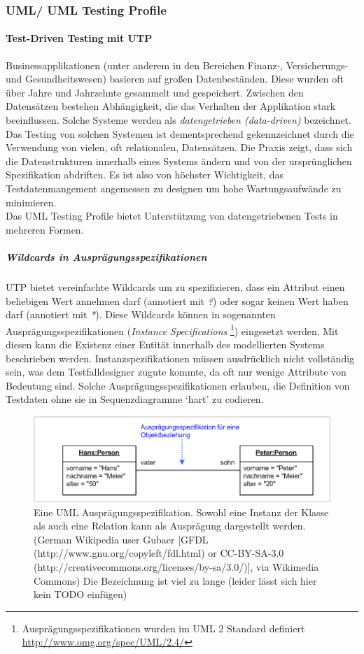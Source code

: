 \subsubsection{UML/ UML Testing Profile}
\paragraph{Test-Driven Testing mit UTP}
Businessapplikationen (unter anderem in den Bereichen Finanz-, Versicherungs- und Gesundheitswesen) basieren auf großen Datenbeständen. Diese wurden oft über Jahre und Jahrzehnte gesammelt und gespeichert. Zwischen den Datensätzen bestehen Abhängigkeit, die das Verhalten der Applikation stark beeinflussen. Solche Systeme werden als \textit{datengetrieben (data-driven)} bezeichnet. Das Testing von solchen Systemen ist dementsprechend gekennzeichnet durch die Verwendung von vielen, oft relationalen, Datensätzen. Die Praxis zeigt, dass sich die Datenstrukturen innerhalb eines Systems ändern und von der ursprünglichen Spezifikation abdriften. Es ist also von höchster Wichtigkeit, das Testdatenmangement angemessen zu designen um hohe Wartungsaufwände zu minimieren.\cite{baker_model-driven_2005}\\
Das UML Testing Profile bietet Unterstützung von datengetriebenen Tests in mehreren Formen.

\subparagraph{Wildcards in Ausprägungsspezifikationen}
UTP bietet vereinfachte Wildcards um zu spezifizieren, dass ein Attribut einen beliebigen Wert annehmen darf (annotiert mit \textit{?}) oder sogar keinen Wert haben darf (annotiert mit \textit{*}). Diese Wildcards können in sogenannten Ausprägungsspezifikationen (\textit{Instance Specifications} \footnote{Ausprägungsspezifikationen wurden im UML 2 Standard definiert \url{http://www.omg.org/spec/UML/2.4/} }) eingesetzt werden. Mit diesen kann die Existenz einer Entität innerhalb des modellierten Systems beschrieben werden. Instanzspezifikationen müssen ausdrücklich nicht vollständig sein, was dem  Testfalldesigner zugute kommte, da oft nur wenige Attribute von Bedeutung sind. Solche Ausprägungsspezifikationen erlauben, die Definition von Testdaten ohne sie in Sequenzdiagramme `hart' zu codieren.
 
\begin{figure}[h] 
  \centering
     \includegraphics[width=1\textwidth]{figures/uml_instance.png}
  \caption{Eine UML Ausprägungsspezifikation. Sowohl eine Instanz der Klasse als auch eine Relation kann als Ausprägung dargestellt werden. (German Wikipedia user Gubaer [GFDL (http://www.gnu.org/copyleft/fdl.html) or CC-BY-SA-3.0 (http://creativecommons.org/licenses/by-sa/3.0/)], via Wikimedia Commons) Die Bezeichnung ist viel zu lange (leider lässt sich hier kein TODO einfügen)}
  \label{fig:uml_instance}
\end{figure}